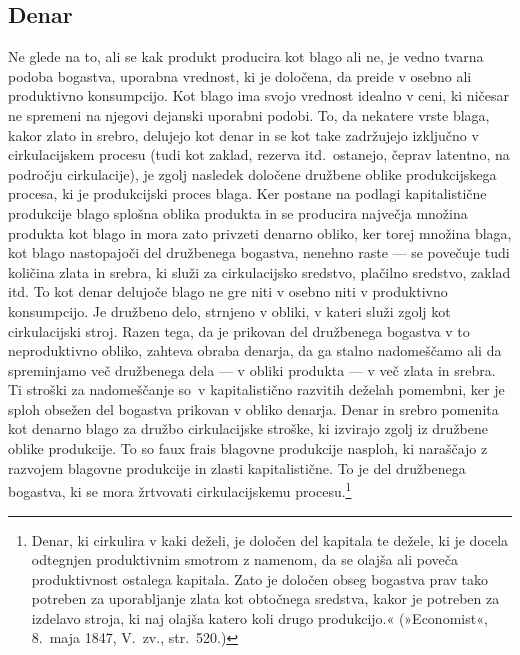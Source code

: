 \documentclass[kapital_02.tex]{subfiles}
\begin{document}
\subsection{Denar}
Ne glede na to, ali se kak produkt producira kot blago ali ne, je vedno tvarna podoba bogastva, uporabna vrednost, ki je določena, da preide v osebno ali produktivno konsumpcijo.
Kot blago ima svojo vrednost idealno v ceni, ki ničesar ne spremeni na njegovi dejanski uporabni podobi.
To, da nekatere vrste blaga, kakor zlato in srebro, delujejo kot denar in se kot take zadržujejo izključno v cirkulacijskem procesu (tudi kot zaklad, rezerva itd.\ ostanejo, čeprav latentno, na področju cirkulacije), je zgolj nasledek določene družbene oblike produkcijskega procesa, ki je produkcijski proces blaga.
Ker postane na podlagi kapitalistične produkcije blago splošna oblika produkta in se producira največja množina produkta kot blago in mora zato privzeti denarno obliko, ker torej množina blaga, kot blago nastopajoči del družbenega bogastva, nenehno raste — se povečuje tudi količina zlata in srebra, ki služi za cirkulacijsko sredstvo, plačilno sredstvo, zaklad itd.
To kot denar delujoče blago ne gre niti v osebno niti v produktivno konsumpcijo.
Je družbeno delo, strnjeno v obliki, v kateri služi zgolj kot cirkulacijski stroj.
Razen tega, da je prikovan del družbenega bogastva v to neproduktivno obliko, zahteva obraba denarja, da ga stalno nadomeščamo ali da spreminjamo več družbenega dela — v obliki produkta — v več zlata in srebra.
Ti stroški za nadomeščanje so\KPEstran\ v kapitalistično razvitih deželah pomembni, ker je sploh obsežen del bogastva prikovan v obliko denarja.
Denar in srebro pomenita kot denarno blago za družbo cirkulacijske stroške, ki izvirajo zgolj iz družbene oblike produkcije.
To so faux frais blagovne produkcije nasploh, ki naraščajo z razvojem blagovne produkcije in zlasti kapitalistične.
To je del družbenega bogastva, ki se mora žrtvovati cirkulacijskemu procesu.\footnote
{Denar, ki cirkulira v kaki deželi, je določen del kapitala te dežele, ki je docela odtegnjen produktivnim smotrom z namenom, da se olajša ali poveča produktivnost ostalega kapitala.
Zato je določen obseg bogastva prav tako potreben za uporabljanje zlata kot obtočnega sredstva, kakor je potreben za izdelavo stroja, ki naj olajša katero koli drugo produkcijo.« (»Economist«, 8.\ maja 1847, V.\ zv., str.\ 520.)}
\end{document}
